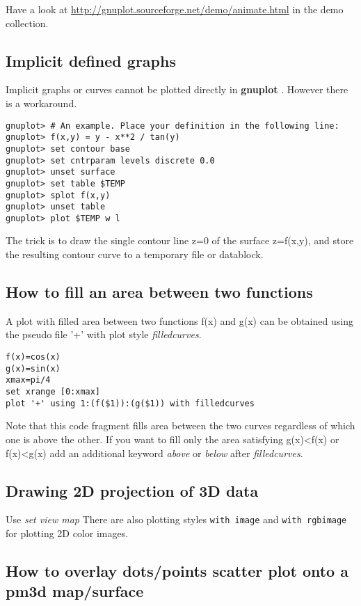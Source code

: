 \documentclass[a4paper,11pt]{article}
\def\http#1{{\small\href{http://#1}{\url{http://#1}}}}
\newcommand{\http}[1]%
            {\htmladdnormallink{\latex{\url{http://#1}}%
                    \html{\textit{http://#1}}}%
                {http://#1}%
            }
\newcommand{\gnuplot}{\textbf{gnuplot }}
\begin{document}
Have a look at
\http{gnuplot.sourceforge.net/demo/animate.html}
in the demo collection.

\subsection{Implicit defined graphs}

Implicit graphs or curves cannot be plotted directly in \gnuplot.
However there is a workaround. 
\small
\begin{verbatim}
gnuplot> # An example. Place your definition in the following line:
gnuplot> f(x,y) = y - x**2 / tan(y)
gnuplot> set contour base
gnuplot> set cntrparam levels discrete 0.0
gnuplot> unset surface
gnuplot> set table $TEMP
gnuplot> splot f(x,y)
gnuplot> unset table
gnuplot> plot $TEMP w l
\end{verbatim}
\normalsize
The trick is to draw the single contour line z=0 of the surface
z=f(x,y), and store the resulting contour curve to a temporary file or datablock.
 

\subsection{How to fill an area between two functions}

A plot with filled area between two functions f(x) and g(x) can be obtained using
the pseudo file '+' with  plot style {\em filledcurves}.
\small
\begin{verbatim}
f(x)=cos(x)
g(x)=sin(x)
xmax=pi/4
set xrange [0:xmax]
plot '+' using 1:(f($1)):(g($1)) with filledcurves
\end{verbatim}
\normalsize

Note that this code fragment fills area between the two curves regardless of
which one is above the other.  If you want to fill only the area satisfying g(x)<f(x)
or f(x)<g(x)
add an additional keyword {\em above} or {\em below} after {\em filledcurves}.



\subsection{Drawing 2D projection of 3D data}

Use \textit{set view map}
There are also plotting styles \verb+with image+ and \verb+with rgbimage+
for plotting 2D color images.

\subsection{How to overlay dots/points scatter plot onto a pm3d map/surface}
\end{document}
